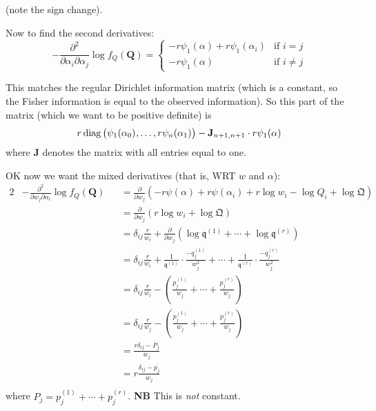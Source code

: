 \documentclass[nojss]{jss}
\DeclareMathOperator{\diag}{diag}
\begin{document}
(note the sign change).

Now to find the second derivatives:
\begin{equation}
 -\frac{\partial^2}{\partial \alpha_i\partial\alpha_j}\log f_Q(\mathbf{Q}) =
 \begin{cases}
-r\psi_1(\alpha)+r\psi_1(\alpha_i)
  &\mbox{if } i=j \\
-r\psi_1(\alpha)&\mbox{if } i\neq j
\end{cases}
\end{equation}

This matches the regular Dirichlet information matrix (which is a
constant, so the Fisher information is equal to the observed
information).  So this part of the matrix (which we want to be
positive definite) is
\begin{equation}
r\diag\left(\psi_1(\alpha_0)^{\vphantom h},\ldots,r\psi_n(\alpha_1)\right)
-\mathbf{J}_{n+1,n+1}\cdot r\psi_1(\alpha)\label{AA}
\end{equation}
where $\mathbf{J}$ denotes the matrix with all entries equal to one.

OK now we want the mixed derivatives (that is, WRT $w$ and $\alpha$):
\begin{alignat}{2}
& -\frac{\partial^2}{\partial w_j\partial\alpha_i}\log f_Q(\mathbf{Q}) &&=
\frac{\partial}{\partial w_j}\left(-r\psi(\alpha)+r\psi(\alpha_i)+r\log w_i-\log Q_i +\log\mathfrak{Q}\right)  \\
& &&=\frac{\partial}{\partial w_j}\left(r\log w_i+\log\mathfrak{Q}\right) \\
& && =\delta_{ij}\frac{r}{w_i} + \frac{\partial}{\partial w_j}\left(\log\mathfrak{q}^{(1)}+\cdots+\log\mathfrak{q}^{(r)}\right)\\
& && =\delta_{ij}\frac{r}{w_i} + \frac{1}{\mathfrak{q}^{(1)}}\cdot\frac{-q_j^{(1)}}{w_j^2}
+\cdots+\frac{1}{\mathfrak{q}^{(r)}}\cdot\frac{-q_j^{(r)}}{w_j^2}\\
& && =\delta_{ij}\frac{r}{w_i} -\left( \frac{p_j^{(1)}}{w_j}+\cdots+\frac{p_j^{(r)}}{w_j}\right)\\
& && =\delta_{ij}\frac{r}{w_j} -\left( \frac{p_j^{(1)}}{w_j}+\cdots+\frac{p_j^{(r)}}{w_j}\right)\\
& && = \frac{r\delta_{ij}-P_j}{w_j}\label{di2_f_di_w_di_alpha}\\
& && = r\frac{\delta_{ij}-\overline{p_j}}{w_j} \label{di2_f_di_w_di_alpha2}\\
\end{alignat}
where $P_j=p_j^{(1)} +\cdots+p_j^{(r)}$.  {\bf NB}
This is {\em not} constant.
\end{document}
